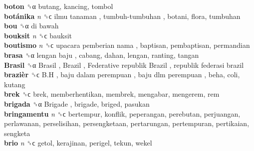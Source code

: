 \textbf{boton} ␝α  butang, kancing, tombol  \\
\textbf{botánika} \emph{n}  ␝ϲ   ilmu tanaman ,  tumbuh-tumbuhan , botani, flora, tumbuhan  \\
\textbf{bou} ␝α   di bawah   \\
\textbf{bouksit} \emph{n}  ␝ϲ  bauksit  \\
\textbf{boutismo} \emph{n}  ␝ϲ   upacara pemberian nama , baptisan, pembaptisan, permandian  \\
\textbf{brasa} ␝α   lengan baju , cabang, dahan, lengan, ranting, tangan  \\
\textbf{Brasil} ␝α   Brasil ,  Brazil ,  Federative republik Brazil ,  republik federasi brazil   \\
\textbf{brazièr} ␝ϲ   B.H ,  baju dalam perempuan ,  baju dlm perempuan , beha, coli, kutang  \\
\textbf{brek} ␝ϲ  brek, memberhentikan, membrek, mengabar, mengerem, rem  \\
\textbf{brigada} ␝α   Brigade , brigade, briged, pasukan  \\
\textbf{bringamentu} \emph{n}  ␝ϲ  bertempur, konflik, peperangan, perebutan, perjuangan, perlawanan, perselisihan, persengketaan, pertarungan, pertempuran, pertikaian, sengketa  \\
\textbf{brio} \emph{n}  ␝ϲ  getol, kerajinan, perigel, tekun, wekel  \\
